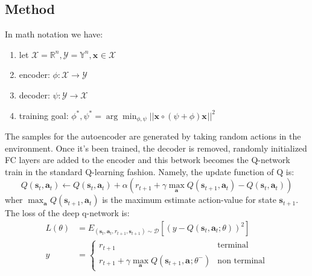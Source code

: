 \documentclass{article}
\newcommand{\argmin}{\arg\!\min}
\begin{document}
\subsection{Method}
In math notation we have:
\begin{enumerate}
		\item let $ \mathcal{X} = \mathbb{R}^{ n }, \mathcal{Y} = \mathbb{Y}^{ n }, \bm{x}_{} \in \mathcal{X}  $
		\item encoder: $ \phi : \mathcal{X} \to \mathcal{Y}  $
		\item decoder: $ \psi : \mathcal{Y} \to \mathcal{X}  $
		\item training goal: $ \phi^{ * }, \psi^{ * } = \argmin_{\phi, \psi} || \bm{x}_{} \circ (\psi + \phi) \bm{x}_{}||^{ 2 }  $
\end{enumerate}

The samples for the autoencoder are generated by taking random actions in the environment.
Once it's been trained, the decoder is removed, randomly initialized FC layers are 
added to the encoder and this betwork becomes the Q-network train in the standard Q-learning fashion.
Namely, the update function of Q is:
\begin{equation}
		Q (\bm{s}_{t}, \bm{a}_{t} ) \leftarrow 
		Q (\bm{s}_{t}, \bm{a}_{t} ) + \alpha \left( r_{ t+1 } + \gamma \max_{\bm{a}_{}} Q (\bm{s}_{t+1}, \bm{a}_{t} ) - Q (\bm{s}_{t}, \bm{a}_{t} ) \right) 
\end{equation}
wher $ \max_{\bm{a}_{}} Q (\bm{s}_{t+1}, \bm{a}_{t} )  $ is the maximum estimate action-value
for state $ \bm{s}_{t+1}  $.
The loss of the deep q-network is:
\begin{align}
L (\theta) &= E_{ (\bm{s}_{t}, \bm{a}_{t} , r_{ t+1 },\bm{s}_{t+1}  ) \sim \mathcal{D} } 
\left[ (y - Q (\bm{s}_{t}, \bm{a}_{t} ; \theta))^{ 2 } \right] \\
y&= \left\{  
		\begin{array}{ll}
				r_{ t+1 } & \text{terminal}\\
				r_{ t+1 } + \gamma \max_{\bm{a}_{}} Q (\bm{s}_{t+1}, \bm{a}_{}; \theta^{ - }) & \text{non terminal}
\end{array}
		\right.
\end{align}
\end{document}
